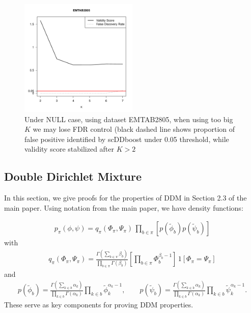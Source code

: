 \documentclass[aoas,preprint]{imsart}
\begin{document}
\begin{figure}[h]
\includegraphics[width = 0.5\textwidth]{Figs/breakFDR.pdf}
 \caption{Under NULL case, using dataset EMTAB2805, when using too big $K$ we may lose FDR control (black dashed line shows proportion of false positive identified by scDDboost under 0.05 threshold, while validity score stabilized after $K > 2$ }
  \label{fig:lfdr}
\end{figure}




\subsection{Double Dirichlet Mixture}

In this section, we give proofs for the properties of  DDM in Section 2.3 of the main paper.
Using notation from the main paper, we have density functions:

\begin{eqnarray*}
p_\pi(\phi,\psi) =
         q_\pi( \Phi_\pi, \Psi_\pi  ) \, \prod_{b \in \pi}  \left[
         p( \tilde \phi_b ) p( \tilde \psi_b ) \right]
\end{eqnarray*}
with
\begin{eqnarray*}
q_\pi( \Phi_\pi, \Psi_\pi  )
= \frac{\Gamma(\sum_{b\in \pi} \beta_b)}{
 \prod_{b \in \pi} \Gamma( \beta_b )} \left[\prod_{b \in \pi} \Phi_b^{\beta_b-1} \right] \,
 1\left[ \Phi_\pi = \Psi_\pi \right]
\end{eqnarray*}
and
\begin{eqnarray*}
p( \tilde \phi_b ) =
\frac{ \Gamma( \sum_{k\in b} \alpha_k ) }{ \prod_{k\in b} \Gamma(\alpha_k) }
 \prod_{k \in b} \tilde \phi_k^{\alpha_k -1 },
\qquad
p( \tilde \psi_b )
=
\frac{ \Gamma( \sum_{k\in b} \alpha_k ) }{ \prod_{k\in b} \Gamma(\alpha_k) }
\prod_{k \in b} \tilde \psi_k^{\alpha_k -1 }.
\end{eqnarray*}
These serve as key components for proving DDM properties.
\end{document}
